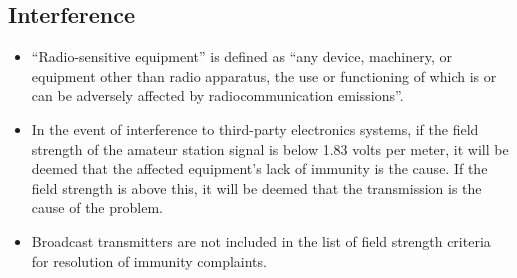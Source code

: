 \documentclass[letterpaper,12pt]{scrartcl}
\begin{document}
\subsection{Interference}

\begin{itemize}
\item ``Radio-sensitive equipment'' is defined as ``any device, machinery, or equipment other than radio apparatus, the use or functioning of which is or can be adversely affected by radiocommunication emissions''.
\item In the event of interference to third-party electronics systems, if the field strength of the amateur station signal is below 1.83 volts per meter,
it will be deemed that the affected equipment's lack of immunity is the cause. If the field strength is above this, it will be deemed that the transmission
is the cause of the problem.
\item Broadcast transmitters are not included in the list of field strength criteria for resolution of immunity complaints.
\end{itemize}
\end{document}
